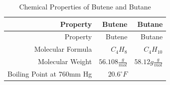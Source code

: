 \documentclass[10pt,parskip=half,
toc=sectionentrywithdots,
bibliography=totocnumbered,
captions=tableheading,numbers=noendperiod]{scrartcl}
\begin{document}
\begin{longtable}[]{@{}rrr@{}}
\caption{Chemical Properties of Butene and Butane
\cite{PubChem-butane, PubChem-butene}
\label{tbl:tbl_butane_prop}}\tabularnewline
\toprule
\begin{minipage}[b]{0.27\columnwidth}\raggedleft
Property\strut
\end{minipage} & \begin{minipage}[b]{0.27\columnwidth}\raggedleft
Butene\strut
\end{minipage} & \begin{minipage}[b]{0.27\columnwidth}\raggedleft
Butane\strut
\end{minipage}\tabularnewline
\midrule
\endfirsthead
\toprule
\begin{minipage}[b]{0.27\columnwidth}\raggedleft
Property\strut
\end{minipage} & \begin{minipage}[b]{0.27\columnwidth}\raggedleft
Butene\strut
\end{minipage} & \begin{minipage}[b]{0.27\columnwidth}\raggedleft
Butane\strut
\end{minipage}\tabularnewline
\midrule
\endhead
\begin{minipage}[t]{0.27\columnwidth}\raggedleft
Molecular Formula\strut
\end{minipage} & \begin{minipage}[t]{0.27\columnwidth}\raggedleft
\(C_4H_8\)\strut
\end{minipage} & \begin{minipage}[t]{0.27\columnwidth}\raggedleft
\(C_4H_{10}\)\strut
\end{minipage}\tabularnewline
\begin{minipage}[t]{0.27\columnwidth}\raggedleft
Molecular Weight\strut
\end{minipage} & \begin{minipage}[t]{0.27\columnwidth}\raggedleft
\(56.108\frac{g}{mol}\)\strut
\end{minipage} & \begin{minipage}[t]{0.27\columnwidth}\raggedleft
\(58.12g\frac{g}{mol}\)\strut
\end{minipage}\tabularnewline
\begin{minipage}[t]{0.27\columnwidth}\raggedleft
Boiling Point at 760mm Hg\strut
\end{minipage} & \begin{minipage}[t]{0.27\columnwidth}\raggedleft
\(20.6^{\circ}F\)\strut
\end{minipage} & \begin{minipage}[t]{0.27\columnwidth}\raggedleft

\end{minipage}
\end{longtable}
\end{document}
